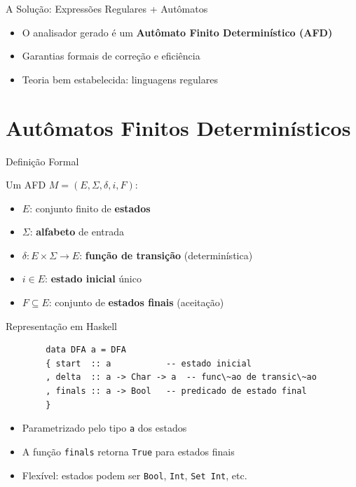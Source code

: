 \begin{frame}{A Solução: Expressões Regulares + Autômatos}

    \begin{itemize}

        \item
        O analisador gerado é um \textbf{Autômato Finito Determinístico (AFD)}
        \item
        Garantias formais de correção e eficiência
        \item
        Teoria bem estabelecida: linguagens regulares
    \end{itemize}
\end{frame}


\section{Autômatos Finitos
Determinísticos}\label{autuxf4matos-finitos-determinuxedsticos}

\begin{frame}{Definição Formal}

    Um AFD \(M = (E, \Sigma, \delta, i, F)\):

    \begin{itemize}

        \item
        \(E\): conjunto finito de \textbf{estados}
        \item
        \(\Sigma\): \textbf{alfabeto} de entrada
        \item
        \(\delta : E \times \Sigma \to E\): \textbf{função de transição}
        (determinística)
        \item
        \(i \in E\): \textbf{estado inicial} único
        \item
        \(F \subseteq E\): conjunto de \textbf{estados finais} (aceitação)
    \end{itemize}
\end{frame}

\begin{frame}[fragile]{Representação em Haskell}

    \begin{lstlisting}
        data DFA a = DFA
        { start  :: a           -- estado inicial
        , delta  :: a -> Char -> a  -- func\~ao de transic\~ao
        , finals :: a -> Bool   -- predicado de estado final
        }
    \end{lstlisting}

    \begin{itemize}

        \item
        Parametrizado pelo tipo \texttt{a} dos estados
        \item
        A função \texttt{finals} retorna
        \texttt{True} para estados finais
        \item
        Flexível: estados podem ser \texttt{Bool},
        \texttt{Int}, \texttt{Set Int}, etc.
    \end{itemize}
\end{frame}

